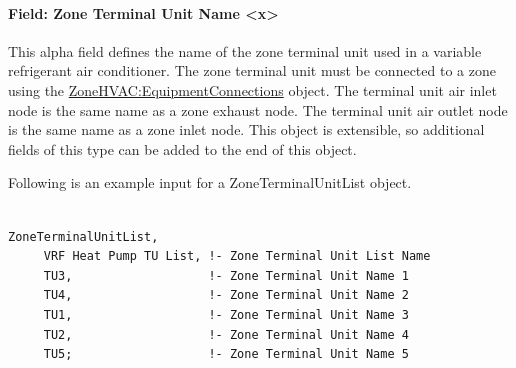 \paragraph{Field: Zone Terminal Unit Name \textless{}x\textgreater{}}\label{field-zone-terminal-unit-name-x}

This alpha field defines the name of the zone terminal unit used in a variable refrigerant air conditioner. The zone terminal unit must be connected to a zone using the \hyperref[zonehvacequipmentconnections]{ZoneHVAC:EquipmentConnections} object. The terminal unit air inlet node is the same name as a zone exhaust node. The terminal unit air outlet node is the same name as a zone inlet node.  This object is extensible, so additional fields of this type can be added to the end of this object.

Following is an example input for a ZoneTerminalUnitList object.

\begin{lstlisting}

ZoneTerminalUnitList,
     VRF Heat Pump TU List, !- Zone Terminal Unit List Name
     TU3,                   !- Zone Terminal Unit Name 1
     TU4,                   !- Zone Terminal Unit Name 2
     TU1,                   !- Zone Terminal Unit Name 3
     TU2,                   !- Zone Terminal Unit Name 4
     TU5;                   !- Zone Terminal Unit Name 5
\end{lstlisting}
